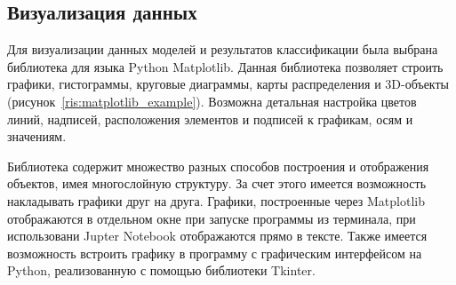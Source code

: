 \subsection{Визуализация данных}
Для визуализации данных моделей и результатов классификации была выбрана библиотека для языка Python Matplotlib. Данная библиотека позволяет строить графики, гистограммы, круговые диаграммы, карты распределения и 3D-объекты (рисунок~\ref{ris:matplotlib_example}). Возможна детальная настройка цветов линий, надписей, расположения элементов и подписей к графикам, осям и значениям.
\\
\par
Библиотека содержит множество разных способов построения и отображения объектов, имея многослойную структуру. За счет этого имеется возможность накладывать графики друг на друга. Графики, построенные через Matplotlib отображаются в отдельном окне при запуске программы из терминала, при использовани Jupter Notebook отображаются прямо в тексте. Также имеется возможность встроить графику в программу с графическим интерфейсом на Python, реализованную с помощью библиотеки Tkinter.
